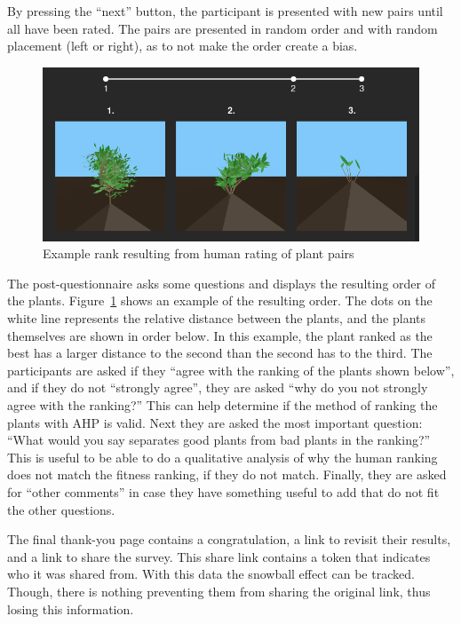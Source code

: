 By pressing the ``next'' button, the participant is presented with new pairs until all have been rated.
The pairs are presented in random order and with random placement (left or right), as to not make the order create a bias.

\begin{figure}
    \centering
    \includegraphics[width=1.0\textwidth]{figures/rank}
    \caption{Example rank resulting from human rating of plant pairs}
    \label{fig:rank}
\end{figure}

The post-questionnaire asks some questions and displays the resulting order of the plants.
Figure~\ref{fig:rank} shows an example of the resulting order.
The dots on the white line represents the relative distance between the plants, and the plants themselves are shown in order below.
In this example, the plant ranked as the best has a larger distance to the second than the second has to the third.
The participants are asked if they ``agree with the ranking of the plants shown below'', and if they do not ``strongly agree'', they are asked ``why do you not strongly agree with the ranking?''
This can help determine if the method of ranking the plants with \gls{AHP} is valid.
Next they are asked the most important question: ``What would you say separates good plants from bad plants in the ranking?''
This is useful to be able to do a qualitative analysis of why the human ranking does not match the fitness ranking, if they do not match.
Finally, they are asked for ``other comments'' in case they have something useful to add that do not fit the other questions.

The final thank-you page contains a congratulation, a link to revisit their results, and a link to share the survey.
This share link contains a token that indicates who it was shared from.
With this data the snowball effect can be tracked.
Though, there is nothing preventing them from sharing the original link, thus losing this information.

